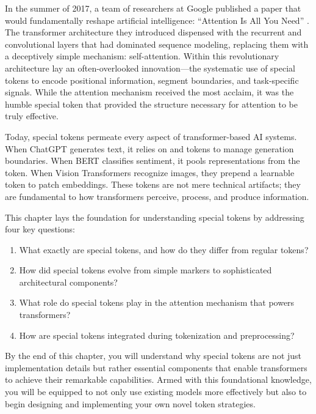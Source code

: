 In the summer of 2017, a team of researchers at Google published a paper that would fundamentally reshape artificial intelligence: ``Attention Is All You Need'' \citep{vaswani2017attention}. The transformer architecture they introduced dispensed with the recurrent and convolutional layers that had dominated sequence modeling, replacing them with a deceptively simple mechanism: self-attention. Within this revolutionary architecture lay an often-overlooked innovation---the systematic use of special tokens to encode positional information, segment boundaries, and task-specific signals. While the attention mechanism received the most acclaim, it was the humble special token that provided the structure necessary for attention to be truly effective.
\begin{comment}
Feedback: This is a great hook. To strengthen it, you could add a sentence that hints at why this "often-overlooked innovation" was so critical. For example: "While the attention mechanism received the most acclaim, it was the humble special token that provided the structure necessary for attention to be truly effective." This helps justify the book's focus right away.

STATUS: addressed - added justification for why special tokens were critical to attention mechanism's effectiveness
\end{comment}

Today, special tokens permeate every aspect of transformer-based AI systems. When ChatGPT generates text, it relies on \sos{} and \eos{} tokens to manage generation boundaries. When BERT classifies sentiment, it pools representations from the \cls{} token. When Vision Transformers recognize images, they prepend a learnable \cls{} token to patch embeddings. These tokens are not mere technical artifacts; they are fundamental to how transformers perceive, process, and produce information.

This chapter lays the foundation for understanding special tokens by addressing four key questions:
\begin{enumerate}
\item What exactly are special tokens, and how do they differ from regular tokens?
\item How did special tokens evolve from simple markers to sophisticated architectural components?
\item What role do special tokens play in the attention mechanism that powers transformers?
\item How are special tokens integrated during tokenization and preprocessing?
\end{enumerate}

By the end of this chapter, you will understand why special tokens are not just implementation details but rather essential components that enable transformers to achieve their remarkable capabilities. Armed with this foundational knowledge, you will be equipped to not only use existing models more effectively but also to begin designing and implementing your own novel token strategies.
